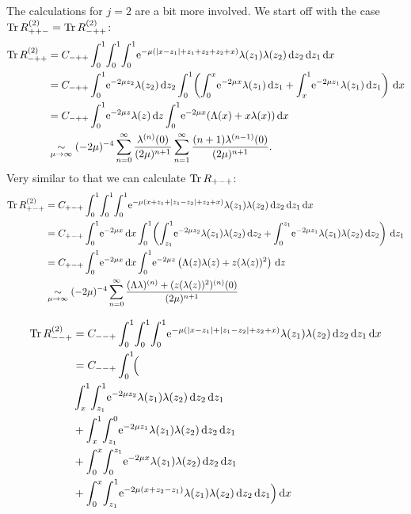 The calculations for $j = 2$ are a bit more involved. We start off with the case
$\operatorname{Tr} R^{(2)}_{++-} =  \operatorname{Tr} R^{(2)}_{-++}$:
\begin{align*}
  \Tr R^{(2)}_{-++} &= C_{-++} \Int{x}{
  \Int{z_1}{
    \Int{z_2}{
      \Eto{-\mu(\Abs{x-z_1} + z_1 + z_2 + z_2 + x)}
      \lambda(z_1)\lambda(z_2)
    }
  }
  } \\
  &= C_{-++} \Int{z_2}{\Eto{-2\mu z_2}\lambda(z_2)}
  \Int{x}{
    \left(
    \Integ[x]{0}{z_1}{
      \Eto{-2\mu x}\lambda(z_1)
    }
    + \Integ[1]{x}{z_1}{
      \Eto{-2\mu z_1}\lambda(z_1)
    }
    \right)
  } \\
  &= C_{-++} \Int{z}{\Eto{-2\mu z}\lambda(z)}
  \Int{x}{\Eto{-2\mu x}(\Lambda(x) + x\lambda(x))} \\
  &\SimMu (-2\mu)^{-4} \Wsum{\lambda^{(n)}} \Wsum[1]{(n+1)\lambda^{(n-1)}}.
\end{align*}
Very similar to that we can calculate $\operatorname{Tr} R_{+-+}$:
\begin{align*}
  \Tr R_{+-+}^{(2)} &= C_{+-+} \Int{x}{
    \Int{z_1}{
      \Int{z_2}{
        \Eto{-\mu(x+z_1 + \Abs{z_1 - z_2} + z_2 + x)}
        \lambda(z_1)\lambda(z_2)
      }
    }
  } \\
  &= C_{+-+} \Int{x}{\Eto{-2\mu x}}
  \Int{z_1}{
    \left(
    \Integ[1]{z_1}{z_2}{
      \Eto{-2\mu z_2}\lambda(z_1)\lambda(z_2)
    }
    + \Integ[z_1]{0}{z_2}{
      \Eto{-2\mu z_1}\lambda(z_1)\lambda(z_2)
    }
    \right)
  } \\
  &= C_{+-+} \Int{x}{\Eto{-2\mu x}}
    \Int{z}{
      \Eto{-2\mu z}\left(
        \Lambda(z)\lambda(z) + z (\lambda(z))^2
      \right)
    } \\
    &\SimMu (-2\mu)^{-4} \sum_{n=0}^\infty \frac{(\Lambda\lambda)^{(n)} +
  (z(\lambda(z))^2)^{(n)}(0)}{(2\mu)^{n+1}}
\end{align*}

\begin{align*}
  \Tr R_{--+}^{(2)} &= C_{--+} \Int{x}{
    \Int{z_1}{
      \Int{z_2}{
        \Eto{-\mu(\Abs{x-z_1} + \Abs{z_1 - z_2} + z_2 + x)}
        \lambda(z_1)\lambda(z_2)
      }
    }
  } \\
  &= C_{--+} \Int{x}{\Bigl( \\
    &\Integ[1]{x}{z_1}{\Integ[1]{z_1}{z_2}{
        \Eto{-2\mu z_2}\lambda(z_1)\lambda(z_2)
      }
    } \\ &+
    \Integ[1]{x}{z_1}{\Integ[0]{z_1}{z_2}{
        \Eto{-2\mu z_1}\lambda(z_1)\lambda(z_2)
      }
    } \\ &+
    \Integ[x]{0}{z_1}{\Integ[z_1]{0}{z_2}{
        \Eto{-2\mu x}\lambda(z_1)\lambda(z_2)
      }
    } \\ &+
      \Integ[x]{0}{z_1}{\Integ[1]{z_1}{z_2}{
        \Eto{-2\mu (x + z_2 - z_1)}\lambda(z_1)\lambda(z_2)
      }
    }
    \Bigr)
  }
\end{align*}

